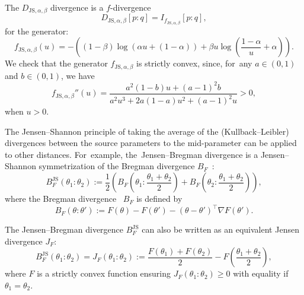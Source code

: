 \documentclass[entropy,article,accept,oneauthor,pdftex,entropy]{Definitions/mdpi}
\def\JS{\mathrm{JS}}
\begin{document}
The $D_{\JS,\alpha,\beta}$ divergence is a $f$-divergence
\begin{equation}
D_{\JS,\alpha,\beta}[p:q]=I_{f_{\JS,\alpha,\beta}}[p:q],
\end{equation}
for the generator:
\begin{equation}
f_{\JS,\alpha,\beta}(u)=-\left((1-\beta)\log\left(\alpha u+(1-\alpha)\right)+\beta u\log\left(\frac{1-\alpha}{u}+\alpha\right)\right).
\end{equation}
We check that the generator $f_{\JS,\alpha,\beta}$ is strictly convex, since, for~any $a\in(0,1)$ and $b\in(0,1)$, we have
\begin{equation}
f_{\JS,\alpha,\beta}''(u)= \frac{a^2(1-b)u+(a-1)^2b}{a^2u^3+2a(1-a)u^2+(a-1)^2u}>0,
\end{equation}
when $u>0$.


 

The Jensen--Shannon principle of taking the average of the (Kullback--Leibler) divergences between the source parameters to the mid-parameter can be applied to other distances. For~example, the~Jensen--Bregman divergence is a Jensen--Shannon symmetrization of the Bregman divergence $B_F$~\cite{BR-2011}:
\begin{equation}\label{eq:jsjb}
B_F^\JS(\theta_1:\theta_2) := \frac{1}{2}\left( B_F\left(\theta_1:\frac{\theta_1+\theta_2}{2}\right)+B_F\left(\theta_2:\frac{\theta_1+\theta_2}{2}\right) \right),
\end{equation}
where the  Bregman divergence~\cite{BregmanKmeans-2005} $B_F$ is defined by
\begin{equation}
B_F(\theta:\theta') := F(\theta)-F(\theta')-(\theta-\theta')^\top \nabla F(\theta').
\end{equation}

The Jensen--Bregman divergence $B_F^\JS$ can also be written as an equivalent Jensen divergence $J_F$:
\begin{equation}\label{eq:jsjbjf}
B_F^\JS(\theta_1:\theta_2) = J_F(\theta_1:\theta_2) := \frac{F(\theta_1)+F(\theta_2)}{2}-F\left(\frac{\theta_1+\theta_2}{2}\right),
\end{equation}
where $F$ is a strictly convex function ensuring $ J_F(\theta_1:\theta_2)\geq 0$ with equality if $\theta_1=\theta_2$.
\end{document}
